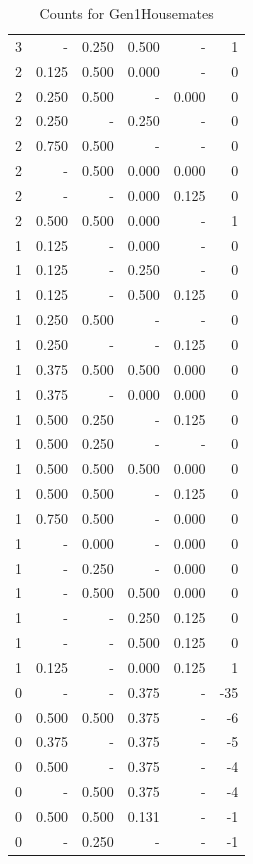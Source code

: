 \documentclass[a4paper]{article}\usepackage{graphicx, color}
\begin{document}
\begin{table}[ht]
\begin{tabular}{rrrrrr}
   \rowcolor{badColor} 3 & - & 0.250 & 0.500 & - & 1 \\ 
   \rowcolor{badColor} 2 & 0.125 & 0.500 & 0.000 & - & 0 \\ 
  2 & 0.250 & 0.500 & - & 0.000 & 0 \\ 
   \rowcolor{sosoColor} 2 & 0.250 & - & 0.250 & - & 0 \\ 
  2 & 0.750 & 0.500 & - & - & 0 \\ 
   \rowcolor{badColor} 2 & - & 0.500 & 0.000 & 0.000 & 0 \\ 
   \rowcolor{sosoColor} 2 & - & - & 0.000 & 0.125 & 0 \\ 
   \rowcolor{badColor} 2 & 0.500 & 0.500 & 0.000 & - & 1 \\ 
   \rowcolor{sosoColor} 1 & 0.125 & - & 0.000 & - & 0 \\ 
   \rowcolor{sosoColor} 1 & 0.125 & - & 0.250 & - & 0 \\ 
   \rowcolor{sosoColor} 1 & 0.125 & - & 0.500 & 0.125 & 0 \\ 
  1 & 0.250 & 0.500 & - & - & 0 \\ 
   \rowcolor{nullColor} 1 & 0.250 & - & - & 0.125 & 0 \\ 
   \rowcolor{goodColor} 1 & 0.375 & 0.500 & 0.500 & 0.000 & 0 \\ 
   \rowcolor{sosoColor} 1 & 0.375 & - & 0.000 & 0.000 & 0 \\ 
  1 & 0.500 & 0.250 & - & 0.125 & 0 \\ 
  1 & 0.500 & 0.250 & - & - & 0 \\ 
   \rowcolor{goodColor} 1 & 0.500 & 0.500 & 0.500 & 0.000 & 0 \\ 
  1 & 0.500 & 0.500 & - & 0.125 & 0 \\ 
  1 & 0.750 & 0.500 & - & 0.000 & 0 \\ 
  1 & - & 0.000 & - & 0.000 & 0 \\ 
  1 & - & 0.250 & - & 0.000 & 0 \\ 
   \rowcolor{goodColor} 1 & - & 0.500 & 0.500 & 0.000 & 0 \\ 
   \rowcolor{sosoColor} 1 & - & - & 0.250 & 0.125 & 0 \\ 
   \rowcolor{sosoColor} 1 & - & - & 0.500 & 0.125 & 0 \\ 
   \rowcolor{sosoColor} 1 & 0.125 & - & 0.000 & 0.125 & 1 \\ 
   \rowcolor{sosoColor} 0 & - & - & 0.375 & - & -35 \\ 
  0 & 0.500 & 0.500 & 0.375 & - & -6 \\ 
   \rowcolor{sosoColor} 0 & 0.375 & - & 0.375 & - & -5 \\ 
   \rowcolor{sosoColor} 0 & 0.500 & - & 0.375 & - & -4 \\ 
  0 & - & 0.500 & 0.375 & - & -4 \\ 
   \rowcolor{badColor} 0 & 0.500 & 0.500 & 0.131 & - & -1 \\ 
  0 & - & 0.250 & - & - & -1 \\ 
   \hline
\end{tabular}
\caption{Counts for Gen1Housemates} 
\end{table}
\end{document}
